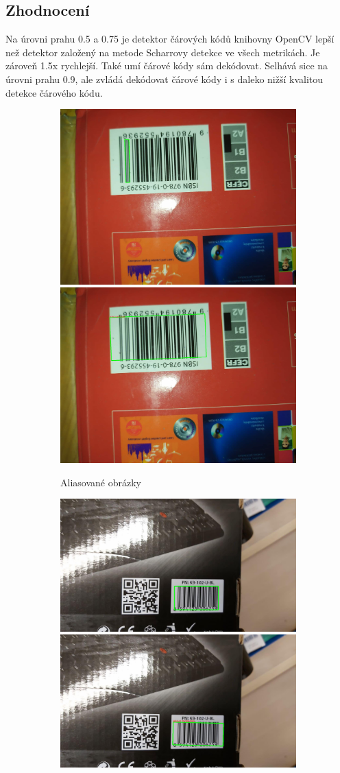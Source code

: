\subsection*{Zhodnocení} Na úrovni prahu 0.5 a 0.75 je detektor čárových kódů knihovny OpenCV lepší než detektor založený na metode Scharrovy detekce ve všech metrikách. Je zároveň 1.5x rychlejší. Také umí čárové kódy sám dekódovat. Selhává sice na úrovni prahu 0.9, ale zvládá dekódovat čárové kódy i s daleko nižší kvalitou detekce čárového kódu.

\begin{figure}[h]\centering
    \centering
    \begin{subfigure}{0.9\textwidth}
    \includegraphics[width=0.4\linewidth]{obrazky-figures/scharr_test1.jpg}\hfill
    \includegraphics[width=0.4\linewidth]{obrazky-figures/opencv_test1.jpg}\hfill
    \caption{Aliasované obrázky}
    \end{subfigure}
    \begin{subfigure}{0.9\textwidth}
    \includegraphics[width=0.4\linewidth]{obrazky-figures/scharr_test3.jpg}\hfill
    \includegraphics[width=0.4\linewidth]{obrazky-figures/opencv_test3.jpg}\hfill

\end{subfigure}
\end{figure}
